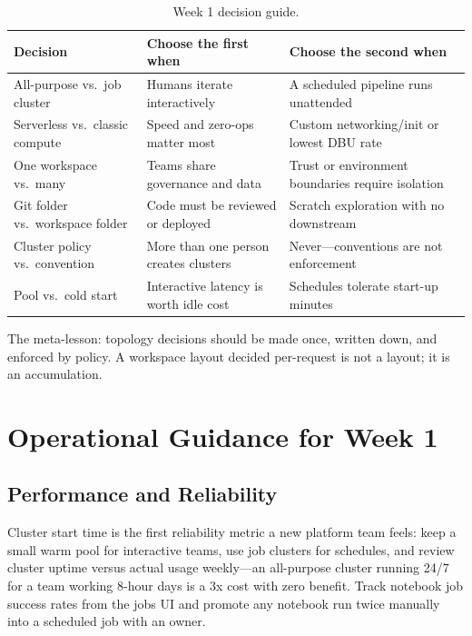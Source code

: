 \begin{table}[H]
\centering
\small
\begin{tabular}{@{}p{3.4cm}p{4.4cm}p{4.6cm}@{}}
\toprule
\textbf{Decision} & \textbf{Choose the first when} & \textbf{Choose the second when} \\
\midrule
All-purpose vs.\ job cluster & Humans iterate interactively & A scheduled pipeline runs unattended \\
Serverless vs.\ classic compute & Speed and zero-ops matter most & Custom networking/init or lowest DBU rate \\
One workspace vs.\ many & Teams share governance and data & Trust or environment boundaries require isolation \\
Git folder vs.\ workspace folder & Code must be reviewed or deployed & Scratch exploration with no downstream \\
Cluster policy vs.\ convention & More than one person creates clusters & Never---conventions are not enforcement \\
Pool vs.\ cold start & Interactive latency is worth idle cost & Schedules tolerate start-up minutes \\
\bottomrule
\end{tabular}
\caption{Week 1 decision guide.}
\label{tab:ch1-decisions}
\end{table}

The meta-lesson: topology decisions should be made once, written down, and enforced by policy. A workspace layout decided per-request is not a layout; it is an accumulation.

\section{Operational Guidance for Week 1}
%
\subsection{Performance and Reliability}
Cluster start time is the first reliability metric a new platform team feels: keep a small warm pool for interactive teams, use job clusters for schedules, and review cluster uptime versus actual usage weekly---an all-purpose cluster running 24/7 for a team working 8-hour days is a 3x cost with zero benefit. Track notebook job success rates from the jobs UI and promote any notebook run twice manually into a scheduled job with an owner.

